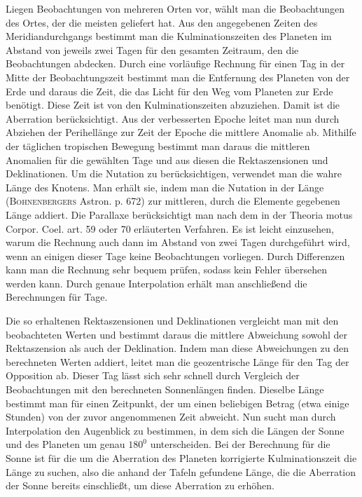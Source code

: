 Liegen Beobachtungen von mehreren Orten vor, wählt man die Beobachtungen des Ortes, der die meisten geliefert hat. Aus den angegebenen Zeiten des Meridiandurchgangs bestimmt man die Kulminationszeiten des Planeten im Abstand von jeweils zwei Tagen für den gesamten Zeitraum, den die Beobachtungen abdecken. Durch eine vorläufige Rechnung für einen Tag in der Mitte der Beobachtungszeit bestimmt man die Entfernung des Planeten von der Erde und daraus die Zeit, die das Licht für den Weg vom Planeten zur Erde benötigt. Diese Zeit ist von den Kulminationszeiten abzuziehen. Damit ist die Aberration berücksichtigt. Aus der verbesserten Epoche leitet man nun durch Abziehen der Perihellänge zur Zeit der Epoche die mittlere Anomalie ab. Mithilfe der täglichen tropischen Bewegung bestimmt man daraus die mittleren Anomalien für die gewählten Tage und aus diesen die Rektaszensionen und Deklinationen. Um die Nutation zu berücksichtigen, verwendet man die wahre Länge des Knotens. Man erhält sie, indem man die Nutation in der Länge (\textsc{Bohnenbergers} Astron. p. 672) zur mittleren, durch die Elemente gegebenen Länge addiert. Die Parallaxe berücksichtigt man nach dem in der Theoria motus Corpor. Coel. art. 59 oder 70 erläuterten Verfahren. Es ist leicht einzusehen, warum die Rechnung auch dann im Abstand von zwei Tagen durchgeführt wird, wenn an einigen dieser Tage keine Beobachtungen vorliegen. Durch Differenzen kann man die Rechnung sehr bequem prüfen, sodass kein Fehler übersehen werden kann. Durch genaue Interpolation erhält man anschließend die Berechnungen für  Tage.

Die so erhaltenen Rektaszensionen und Deklinationen vergleicht man mit den beobachteten Werten und bestimmt daraus die mittlere Abweichung sowohl der Rektaszension als auch der Deklination. Indem man diese Abweichungen zu den berechneten Werten addiert, leitet man die geozentrische Länge für den Tag der Opposition ab. Dieser Tag lässt sich sehr schnell durch Vergleich der Beobachtungen mit den berechneten Sonnenlängen finden. Dieselbe Länge bestimmt man für einen Zeitpunkt, der um einen beliebigen Betrag (etwa einige Stunden) von der zuvor angenommenen Zeit abweicht. Nun sucht man durch Interpolation den Augenblick zu bestimmen, in dem sich die Längen der Sonne und des Planeten um genau \(180^{0}\) unterscheiden. Bei der Berechnung für die Sonne ist für die um die Aberration des Planeten korrigierte Kulminationszeit die  Länge zu suchen, also die anhand der Tafeln gefundene Länge, die die Aberration der Sonne bereits einschließt, um diese Aberration zu erhöhen.

